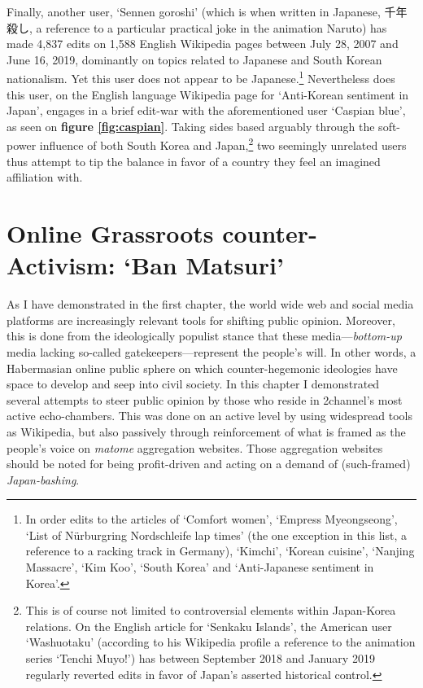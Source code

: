\documentclass[10pt,british,A4paper,,openany]{memoir}
\begin{document}
Finally, another user, `Sennen goroshi' (which is when written in
Japanese, 千年殺し, a reference to a particular practical joke in the
animation Naruto) has made 4,837 edits on 1,588 English Wikipedia pages
between July 28, 2007 and June 16, 2019, dominantly on topics related to
Japanese and South Korean nationalism. Yet this user does not appear to
be Japanese.\footnote{In order edits to the articles of `Comfort women',
  `Empress Myeongseong', `List of Nürburgring Nordschleife lap times'
  (the one exception in this list, a reference to a racking track in
  Germany), `Kimchi', `Korean cuisine', `Nanjing Massacre', `Kim Koo',
  `South Korea' and `Anti-Japanese sentiment in Korea'.} Nevertheless
does this user, on the English language Wikipedia page for `Anti-Korean
sentiment in Japan', engages in a brief edit-war with the aforementioned
user `Caspian blue', as seen on \textbf{figure \ref{fig:caspian}}.
Taking sides based arguably through the soft-power influence of both
South Korea and Japan,\footnote{This is of course not limited to
  controversial elements within Japan-Korea relations. On the English
  article for `Senkaku Islands', the American user `Washuotaku'
  (according to his Wikipedia profile a reference to the animation
  series `Tenchi Muyo!') has between September 2018 and January 2019
  regularly reverted edits in favor of Japan's asserted historical
  control.} two seemingly unrelated users thus attempt to tip the
balance in favor of a country they feel an imagined affiliation with.

\section{\texorpdfstring{Online Grassroots counter-Activism: `Ban
Matsuri'}{Online Grassroots counter-Activism: Ban Matsuri}}\label{online-grassroots-counter-activism-ban-matsuri}

As I have demonstrated in the first chapter, the world wide web and
social media platforms are increasingly relevant tools for shifting
public opinion. Moreover, this is done from the ideologically populist
stance that these media---\emph{bottom-up} media lacking so-called
gatekeepers---represent the people's will. In other words, a Habermasian
online public sphere on which counter-hegemonic ideologies have space to
develop and seep into civil society. In this chapter I demonstrated
several attempts to steer public opinion by those who reside in
2channel's most active echo-chambers. This was done on an active level
by using widespread tools as Wikipedia, but also passively through
reinforcement of what is framed as the people's voice on \emph{matome}
aggregation websites. Those aggregation websites should be noted for
being profit-driven and acting on a demand of (such-framed)
\emph{Japan-bashing}.
\end{document}

